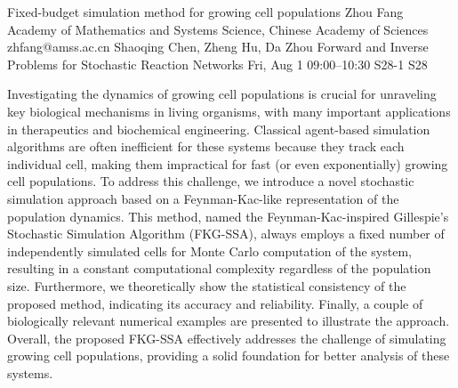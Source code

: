 \begin{talk}
  {Fixed-budget simulation method for growing cell populations}%
  {Zhou Fang}%
  {Academy of Mathematics and Systems Science, Chinese Academy of Sciences}%
  {zhfang@amss.ac.cn}%
  {Shaoqing Chen, Zheng Hu, Da Zhou}%
  {Forward and Inverse Problems for Stochastic Reaction Networks}%
  {Fri, Aug 1 09:00–10:30}%
  {S28-1}%
  {S28}%
				
			
Investigating the dynamics of growing cell populations is crucial for unraveling key biological mechanisms in living organisms, with many important applications in therapeutics and biochemical engineering. Classical agent-based simulation algorithms are often inefficient for these systems because
they track each individual cell, making them impractical for fast (or even exponentially) growing
cell populations. To address this challenge, we introduce a novel stochastic simulation approach
based on a Feynman-Kac-like representation of the population dynamics. This method, named the
Feynman-Kac-inspired Gillespie’s Stochastic Simulation Algorithm (FKG-SSA), always employs a
fixed number of independently simulated cells for Monte Carlo computation of the system, resulting in a constant computational complexity regardless of the population size. Furthermore, we
theoretically show the statistical consistency of the proposed method, indicating its accuracy and
reliability. Finally, a couple of biologically relevant numerical examples are presented to illustrate the
approach. Overall, the proposed FKG-SSA effectively addresses the challenge of simulating growing
cell populations, providing a solid foundation for better analysis of these systems.


\end{talk}

